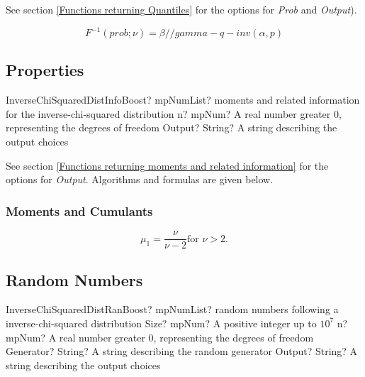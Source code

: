See section \ref{Functions returning Quantiles} for the options for  {\itshape\sffamily Prob} and {\itshape\sffamily Output}). 

\begin{equation} 
	F^{-1}(prob;\nu)= \beta / / gamma-q-inv(\alpha, p)
\end{equation}


\subsection{Properties}
\label{InverseChiSquaredDistributionProperties}


\begin{mpFunctionsExtract}
	\mpFunctionTwo
	{InverseChiSquaredDistInfoBoost? mpNumList? moments and related information for the inverse-chi-squared distribution}
	{n? mpNum? A real number greater 0, representing the degrees of freedom}
	{Output? String? A string describing the output choices}
\end{mpFunctionsExtract}

\vspace{0.3cm}

See section \ref{Functions returning moments and related information} for the options for {\itshape\sffamily Output}. Algorithms and formulas are given below.

\subsubsection{Moments and Cumulants}
\begin{equation} 
	\mu_1 = \frac{\nu}{\nu-2} \text{for } \nu>2.
\end{equation}



\subsection{Random Numbers}

\begin{mpFunctionsExtract}
	\mpFunctionFour
	{InverseChiSquaredDistRanBoost? mpNumList? random numbers following a inverse-chi-squared distribution}
	{Size? mpNum? A positive integer up to $10^7$}
	{n? mpNum? A real number greater 0, representing the degrees of freedom}
	{Generator? String? A string describing the random generator}
	{Output? String? A string describing the output choices}
\end{mpFunctionsExtract}



